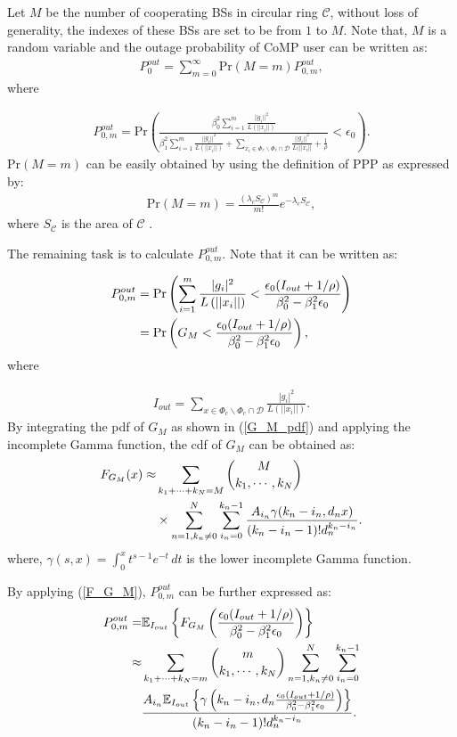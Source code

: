 \documentclass[10pt, doublecolumn]{IEEEtran}
\newcommand{\Equ}[1]{
  \begin{align}
    #1
  \end{align}}
\begin{document}
\begin{IEEEproof}
Let $M$ be the number of cooperating BSs in circular ring $\mathcal{C}$, without loss of generality, the indexes of these BSs are set to be from $1$ to $M$.  Note that, $M$ is a random variable and the outage probability of CoMP user can be written as:
\begin{align}
 P_{0}^{out}=\sum_{m=0}^{\infty}\text{Pr}(M=m)P^{out}_{0,m},
\end{align}
where
\Equ{
    P_{0,m}^{out}= \text{Pr}\left(
    \frac{\beta^2_0\sum\limits_{i=1}^m\frac{||g_i||^2}{L(||x_i||)}}
                {\beta_1^2\sum\limits_{i=1}^m\frac{||g_i||^2}{L(||x_i||)}+
                \sum\limits_{x_i\in \Phi _c\backslash \Phi _c\cap \mathcal{D}}\frac{||g_i||^2}{L(||x_i||}
                +\frac{1}{\rho}}<\epsilon_0
    \right).
}
$\text{Pr}(M=m)$ can be easily obtained by using the definition of PPP as expressed by:
\begin{align}\label{P_Mm}
\text{Pr}(M=m)=\frac{(\lambda_cS_{\mathcal{C}})^m}{m!}e^{-\lambda_cS_{\mathcal{C}}},
\end{align}
where $S_{\mathcal{C}}$ is the area of $\mathcal{C}$ \cite{haenggi2012stochastic}.

The remaining task is to calculate $P_{0,m}^{out}$. Note that it can be written as:
\Equ{
     P_{0,m}^{out}&=\text{Pr}\left( \sum_{i=1}^m{\frac{|g_i|^2}{L\left( ||x_i|| \right)}}< \frac{\epsilon_0(I_{out}+1/\rho)}{\beta_0^2-\beta_1^2\epsilon_0} \right)\\\notag
     &=\text{Pr}\left( G_M< \frac{\epsilon_0(I_{out}+1/\rho)}{\beta_0^2-\beta_1^2\epsilon_0} \right),
}
where
\Equ{
 I_{out}=\sum_{x\in \Phi _c\backslash \Phi _c\cap \mathcal{D}}{\frac{|g_i|^2}{L\left( ||x_i|| \right)}}.
}
By integrating the pdf of $G_M$ as shown in (\ref{G_M_pdf}) and applying the incomplete Gamma function, the cdf of $G_M$ can be obtained as:
\begin{align}\label{F_G_M}
F_{G_M}(x)\approx&\sum_{\substack{k_1+\cdots+k_N=M}}{M \choose k_1, \cdots, k_N}
\\\notag
&\times\sum\limits_{n=1,k_n\neq0}^{N}\sum\limits_{i_n=0}^{k_n-1}\frac{
A_{i_n}\gamma(k_n-i_n,d_nx)}{(k_n-i_n-1)!d_n^{k_n-i_n}}.
\end{align}
where, $\gamma(s,x)=\int_{0}^xt^{s-1}e^{-t}\,dt$ is the lower incomplete Gamma function.

By applying (\ref{F_G_M}), $P_{0,m}^{out}$ can be further expressed as:
\begin{align}\label{P_G_m}
P_{0,m}^{out} =&\mathbb{E}_{I_{out}}\left\{F_{G_M}\left(\frac{\epsilon_0(I_{out}+1/\rho)}{\beta_0^2-\beta_1^2\epsilon_0}\right)\right\}\\\notag
\approx&\sum_{\substack{k_1+\cdots+k_N=m}}{m \choose k_1, \cdots, k_N}
\sum\limits_{n=1,k_n\neq0}^{N}\sum\limits_{i_n=0}^{k_n-1}\\\notag
&\frac{
A_{i_n}\mathbb{E}_{I_{out}}\left\{\gamma\left(k_n-i_n,d_n\frac{\epsilon_0(I_{out}+1/\rho)}{\beta_0^2-\beta_1^2\epsilon_0}\right)\right\}}{(k_n-i_n-1)!d_n^{k_n-i_n}}.
\end{align}


\end{IEEEproof}
\end{document}
